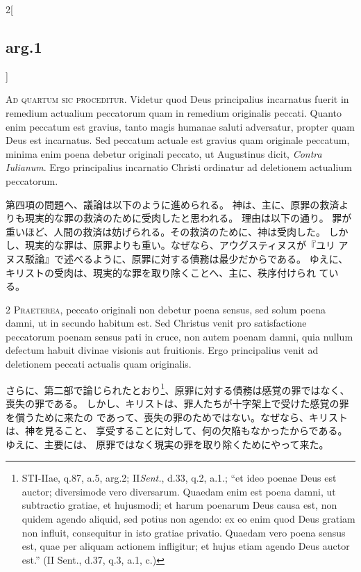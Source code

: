 \documentclass[paper=a4paper,fontsize=10pt,jafontsize=9pt,titlepage]{jlreq}
\begin{document}
\begin{paracol}{2}[\subsection{arg.1}]

{\Huge A}{\scshape d quartum sic proceditur}. Videtur quod
Deus principalius incarnatus fuerit in remedium actualium peccatorum
quam in remedium originalis peccati. Quanto enim peccatum est gravius,
tanto magis humanae saluti adversatur, propter quam Deus est
incarnatus. Sed peccatum actuale est gravius quam originale peccatum,
minima enim poena debetur originali peccato, ut Augustinus dicit, {\itshape Contra
Iulianum}. Ergo principalius incarnatio Christi ordinatur ad deletionem
actualium peccatorum.

\switchcolumn

第四項の問題へ、議論は以下のように進められる。
神は、主に、原罪の救済よりも現実的な罪の救済のために受肉したと思われる。
 理由は以下の通り。
罪が重いほど、人間の救済は妨げられる。その救済のために、神は受肉した。
しかし、現実的な罪は、原罪よりも重い。なぜなら、アウグスティヌスが『ユリ
 アヌス駁論』で述べるように、原罪に対する債務は最少だからである。
ゆえに、キリストの受肉は、現実的な罪を取り除くことへ、主に、秩序付けられ
 ている。


2 {\scshape Praeterea}, peccato originali non debetur
poena sensus, sed solum poena damni, ut in secundo habitum est. Sed
Christus venit pro satisfactione peccatorum poenam sensus pati in cruce,
non autem poenam damni, quia nullum defectum habuit divinae visionis aut
fruitionis. Ergo principalius venit ad deletionem peccati actualis quam
originalis.

\switchcolumn

さらに、第二部で論じられたとおり\footnote{STI-IIae, q.87, a.5, arg.2;
 II{\itshape Sent.}, d.33, q.2, a.1.; ``et ideo poenae Deus est auctor;
 diversimode vero diversarum. Quaedam enim est poena damni, ut
 subtractio gratiae, et hujusmodi; et harum poenarum Deus causa est, non
 quidem agendo aliquid, sed potius non agendo: ex eo enim quod Deus
 gratiam non influit, consequitur in isto gratiae privatio. Quaedam vero
 poena sensus est, quae per aliquam actionem infligitur; et hujus etiam
 agendo Deus auctor est.'' (II Sent., d.37, q.3, a.1, c.)
}、原罪に対する債務は感覚の罪ではなく、喪失の罪である。
しかし、キリストは、罪人たちが十字架上で受けた感覚の罪を償うために来たの
 であって、喪失の罪のためではない。なぜなら、キリストは、神を見ること、
 享受することに対して、何の欠陥もなかったからである。ゆえに、主要には、
 原罪ではなく現実の罪を取り除くためにやって来た。


\end{paracol}
\end{document}
